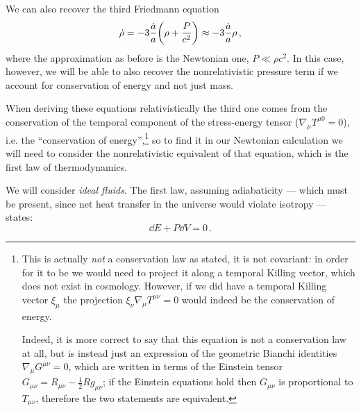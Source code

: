 \documentclass[main.tex]{subfiles}
\begin{document}



We can also recover the third Friedmann equation 
\begin{equation}
\dot{\rho} = -3 \frac{\dot{a}}{a} \qty(\rho + \frac{P}{c^2}) \approx -3 \frac{\dot{a}}{a} \rho 
\,,
\end{equation}
%
where the approximation as before is the Newtonian one, \(P \ll \rho c^2\). In this case, however, we will be able to also recover the nonrelativistic pressure term if we account for conservation of energy and not just mass.

When deriving these equations relativistically the third one comes from the conservation of the temporal component of the stress-energy tensor (\(\nabla_{\mu } T^{\mu 0} = 0\)), i.e. the ``conservation of energy'',\footnote{This is actually \emph{not} a conservation law as stated, it is not covariant: in order for it to be we would need to project it along a temporal Killing vector, which does not exist in cosmology. However, if we did have a temporal Killing vector \(\xi_{\mu }\) the projection \(\xi_{\nu } \nabla_{\mu } T^{\mu \nu } =0\) would indeed be the conservation of energy.

Indeed, it is more correct to say that this equation is not a conservation law at all, but is instead just an expression of the geometric Bianchi identities \(\nabla_{\mu } G^{\mu \nu }=0\), which are written in terms of the Einstein tensor \(G_{\mu \nu } = R_{\mu \nu } - \frac{1}{2} R g_{\mu \nu }\); if the Einstein equations hold then \(G_{\mu \nu } \) is proportional to \(T_{\mu \nu }\), therefore the two statements are equivalent.}
so to find it in our Newtonian calculation we will need to consider the nonrelativistic equivalent of that equation, which is the first law of thermodynamics.

We will consider \emph{ideal fluids}.
The first law, assuming adiabaticity --- which must be present, since net heat transfer in the universe would violate isotropy ---  states:
\begin{equation}
  \dd{E} + P\dd{V} = 0\,.
\end{equation}
\end{document}
